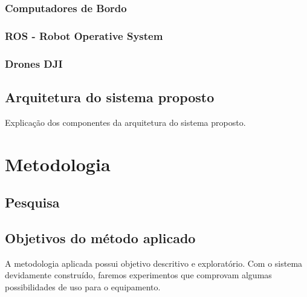 \documentclass[12pt,a4paper,oneside]{book}
\begin{document}
\subsection{Computadores de Bordo}

\subsection{ROS - Robot Operative System}

\subsection{Drones DJI}

\section{Arquitetura do sistema proposto}

Explicação dos componentes da arquitetura do sistema proposto.
%



\chapter{Metodologia}
\label{chapter:Metodologia}
%
\thispagestyle{empty} 
%
\section{Pesquisa}


%
\section{Objetivos do método aplicado}
A metodologia aplicada possui objetivo descritivo e exploratório. Com o sistema devidamente construído, faremos experimentos que comprovam algumas possibilidades de uso para o equipamento.
\end{document}
